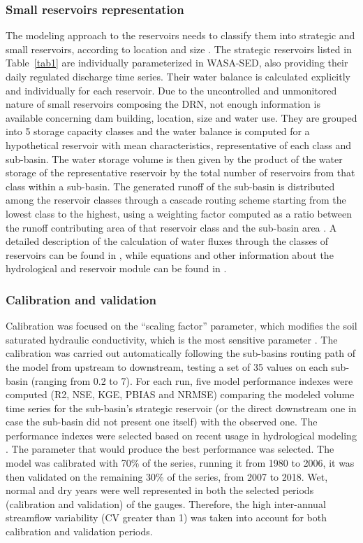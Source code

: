 \documentclass[draft]{agujournal2019}
\begin{document}
\subsubsection{Small reservoirs representation}
The modeling approach to the reservoirs needs to classify them into strategic and small reservoirs, according to location and size \cite{Guntner2004}. The strategic reservoirs listed in Table~\ref{tab1} are individually parameterized in WASA-SED, also providing their daily regulated discharge time series. Their water balance is calculated explicitly and individually for each reservoir. Due to the uncontrolled and unmonitored nature of small reservoirs composing the DRN, not enough information is available concerning dam building, location, size and water use. They are grouped into 5 storage capacity classes and the water balance is computed for a hypothetical reservoir with mean characteristics, representative of each class and sub-basin. The water storage volume is then given by the product of the water storage of the representative reservoir by the total number of reservoirs from that class within a sub-basin. The generated runoff of the sub-basin is distributed among the reservoir classes through a cascade routing scheme starting from the lowest class to the highest, using a weighting factor computed as a ratio between the runoff contributing area of that reservoir class and the sub-basin area \cite{Mamede2018}. A detailed description of the calculation of water fluxes through the classes of reservoirs can be found in , while equations and other information about the hydrological and reservoir module can be found in .

\subsubsection{Calibration and validation}
Calibration was focused on the “scaling factor” parameter, which modifies the soil saturated hydraulic conductivity, which is the most sensitive parameter \cite{Guntner2002,WASA-SEDManual2021}. The calibration was carried out automatically following the sub-basins routing path of the model from upstream to downstream, testing a set of 35 values on each sub-basin (ranging from 0.2 to 7). For each run, five model performance indexes were computed (R2, NSE, KGE, PBIAS and NRMSE) comparing the modeled volume time series for the sub-basin’s strategic reservoir (or the direct downstream one in case the sub-basin did not present one itself) with the observed one. The performance indexes were selected based on recent usage in hydrological modeling \cite{Marahatta2021,Knoben2019,Uniyal2019}. The parameter that would produce the best performance was selected. The model was calibrated with 70\% of the series, running it from 1980 to 2006, it was then validated on the remaining 30\% of the series, from 2007 to 2018. Wet, normal and dry years were well represented in both the selected periods (calibration and validation) of the gauges. Therefore, the high inter-annual streamflow variability (CV greater than 1) was taken into account for both calibration and validation periods.
\end{document}
